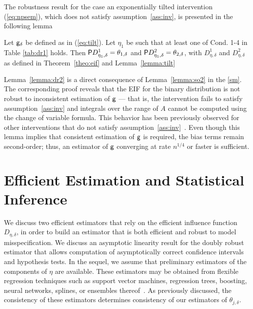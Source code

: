 The robustness result for the case an exponentially tilted intervention
(\ref{eq:npsem}), which does not satisfy assumption~\ref{ass:inv}, is presented
in the following lemma
\begin{lemma}
  \label{lemma:dr2}
  Let $\g_\delta$ be defined as in (\ref{eq:tilt}). Let $\eta_1$ be such that at
  least one of Cond. 1-4 in Table \ref{tab:dr1} holds. Then $\P
  D_{\eta_1,\delta}^1=\theta_{1,\delta}$ and $\P
  D_{\eta_1,\delta}^2=\theta_{2,\delta}$, with $D_{\eta,\delta}^1$ and
  $D_{\eta,\delta}^2$ as defined in Theorem~\ref{theo:eif} and
  Lemma~\ref{lemma:tilt}
\end{lemma}

Lemma~\ref{lemma:dr2} is a direct consequence of Lemma~\ref{lemma:so2} in
the \ref{sm}. The corresponding proof reveals that the EIF for the binary
distribution is not robust to inconsistent estimation of $\g$ --- that is, the
intervention fails to satisfy assumption~\ref{ass:inv} and integrals over the
range of $A$ cannot be computed using the change of variable formula. This
behavior has been previously observed for other interventions that do not
satisfy assumption~\ref{ass:inv}~\citep[e.g.,][]{diaz2013assessing}. Even though
this lemma implies that consistent estimation of $\g$ is required, the bias
terms remain second-order; thus, an estimator of $\g$ converging at rate
$n^{1/4}$ or faster is sufficient.

\section{Efficient Estimation and Statistical Inference}\label{sec:estima}
We discuss two efficient estimators that rely on the efficient influence
function $D_{\eta, \delta}$, in order to build an estimator that is both
efficient and robust to model misspecification. We discuss an asymptotic
linearity result for the doubly robust estimator that allows computation of
asymptotically correct confidence intervals and hypothesis tests. In the sequel,
we assume that preliminary estimators of the components of $\eta$ are available.
These estimators may be obtained from flexible regression techniques such as
support vector machines, regression trees, boosting, neural networks, splines,
or ensembles thereof~\citep{wolpert1992stacked, breiman1996stacked,
vdl2007super}. As previously discussed, the consistency of these estimators
determines consistency of our estimators of $\theta_{j, \delta}$.

